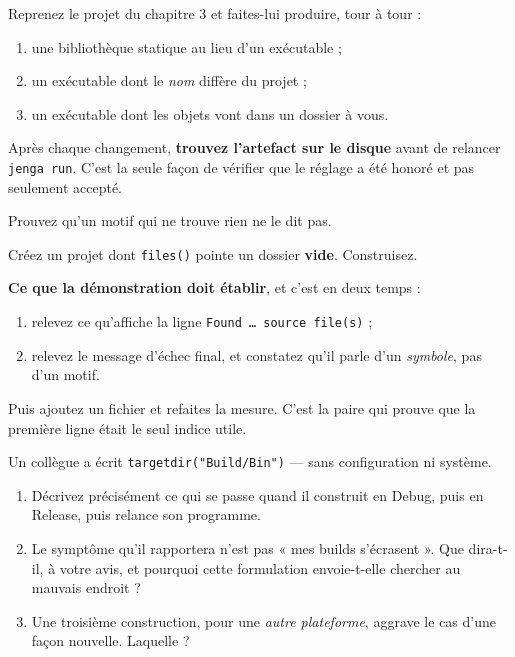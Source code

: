 \begin{nkpratique}
Reprenez le projet du chapitre 3 et faites-lui produire, tour à tour :

\begin{enumerate}
\item une bibliothèque statique au lieu d'un exécutable ;
\item un exécutable dont le \emph{nom} diffère du projet ;
\item un exécutable dont les objets vont dans un dossier à vous.
\end{enumerate}

Après chaque changement, \textbf{trouvez l'artefact sur le disque} avant de
relancer \texttt{jenga run}. C'est la seule façon de vérifier que le réglage a
été honoré et pas seulement accepté.
\end{nkpratique}

\begin{nkdemo}
Prouvez qu'un motif qui ne trouve rien ne le dit pas.

Créez un projet dont \texttt{files()} pointe un dossier \textbf{vide}. Construisez.

\textbf{Ce que la démonstration doit établir}, et c'est en deux temps :
\begin{enumerate}
\item relevez ce qu'affiche la ligne \texttt{Found \dots\ source file(s)} ;
\item relevez le message d'échec final, et constatez qu'il parle d'un
      \emph{symbole}, pas d'un motif.
\end{enumerate}

Puis ajoutez un fichier et refaites la mesure. C'est la paire qui prouve que la
première ligne était le seul indice utile.
\end{nkdemo}

\begin{nklogique}
Un collègue a écrit \texttt{targetdir("Build/Bin")} --- sans configuration ni
système.

\begin{enumerate}
\item Décrivez précisément ce qui se passe quand il construit en Debug, puis en
      Release, puis relance son programme.
\item Le symptôme qu'il rapportera n'est pas « mes builds s'écrasent ». Que
      dira-t-il, à votre avis, et pourquoi cette formulation envoie-t-elle
      chercher au mauvais endroit ?
\item Une troisième construction, pour une \emph{autre plateforme}, aggrave le
      cas d'une façon nouvelle. Laquelle ?
\end{enumerate}
\end{nklogique}
